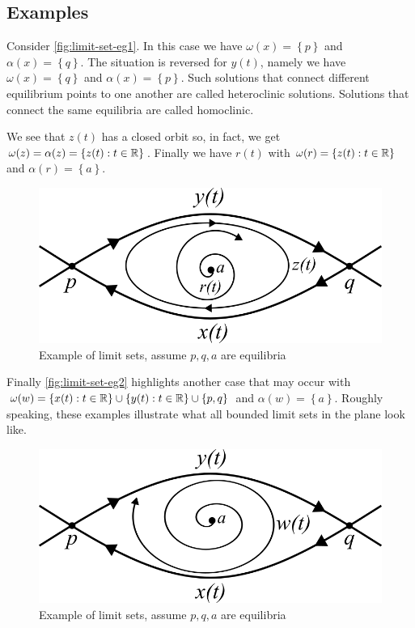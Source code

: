 \subsection{Examples}
Consider \autoref{fig:limit-set-eg1}. In this case we have $\omega(x) = \left\{p\right\}$ and $\alpha(x) = \left\{q\right\}$. The situation is reversed for $y(t)$, namely we have $\omega(x) = \left\{q\right\}$ and $\alpha(x) = \left\{p\right\}$. Such solutions that connect different equilibrium points to one another are called heteroclinic solutions. Solutions that connect the same equilibria are called homoclinic.

We see that $z(t)$ has a closed orbit so, in fact, we get $\omega(z) = \alpha(z) = \left\{ z(t): t \in \mathbb{R} \right\}$. Finally we have $r(t)$ with $\omega(r) = \left\{z(t): t \in \mathbb{R} \right\}$ and $\alpha(r) = \left\{a\right\}$.
\begin{figure}[h]
    \centering
    \includegraphics[scale=0.5]{Images/limit_set_eg1.png}
    \caption{Example of limit sets, assume $p, q, a$ are equilibria}
    \label{fig:limit-set-eg1}
\end{figure}
Finally \autoref{fig:limit-set-eg2} highlights another case that may occur with $\omega(w) = \left\{x(t): t \in \mathbb{R} \right\} \cup \left\{y(t): t \in \mathbb{R} \right\} \cup \{p, q\}$ and $\alpha(w) = \left\{a\right\}$. Roughly speaking, these examples illustrate what all bounded limit sets in the plane look like.

\begin{figure}[h]
    \centering
    \includegraphics[scale=0.5]{Images/limit_set_eg2.png}
    \caption{Example of limit sets, assume $p, q, a$ are equilibria}
    \label{fig:limit-set-eg2}
\end{figure}


